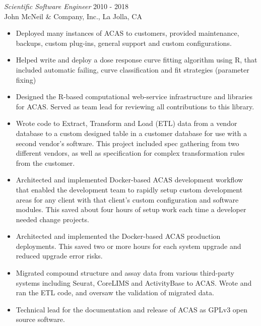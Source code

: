 \documentclass[margin, 10pt]{res} %
\begin{document}
\begin{resume}
{\sl Scientific Software Engineer} \hfill 2010 - 2018  \\
John McNeil \& Company, Inc., La Jolla, CA 
\begin{itemize}
\item Deployed many instances of ACAS to customers, provided maintenance, backups, custom plug-ins, general support and custom configurations.
\item Helped write and deploy a dose response curve fitting algorithm using R, that included automatic failing, curve classification and fit strategies (parameter fixing)
\item Designed the R-based computational web-service infrastructure and libraries for ACAS. Served as team lead for reviewing all contributions to this library.
\item Wrote code to Extract, Transform and Load (ETL) data from a vendor database to a custom designed table in a customer database for use with a second vendor’s software. This project included spec gathering from two different vendors, as well as specification for complex transformation rules from the customer.
\item Architected and implemented Docker-based ACAS development workflow that enabled the development team to rapidly setup custom development areas for any client with that client’s custom configuration and software modules. This saved about four hours of setup work each time a developer needed change projects.
\item Architected and implemented the Docker-based ACAS production deployments. This saved two or more hours for each system upgrade and reduced upgrade error risks.
\item Migrated compound structure and assay data from various third-party systems including Seurat, CoreLIMS and ActivityBase to ACAS. Wrote and ran the ETL code, and oversaw the validation of migrated data.
\item Technical lead for the documentation and release of ACAS as GPLv3 open source software. 
\end{itemize} 


\end{resume}
\end{document}
